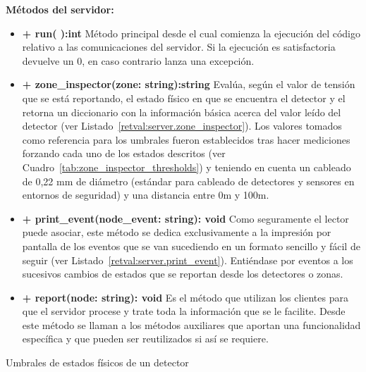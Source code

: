 

\textbf{Métodos del servidor:}

\begin{itemize}
  \item \textbf{+ run( ):int} Método principal desde el cual comienza la ejecución del código relativo a las comunicaciones del servidor. Si la ejecución es satisfactoria devuelve un 0, en caso contrario lanza una excepción.
  \item \textbf{+ zone\_inspector(zone: string):string} Evalúa, según el valor de tensión que se está reportando, el estado físico en que se encuentra el detector y el retorna un diccionario con la información básica acerca del valor leído del detector (ver Listado~\ref{retval:server.zone_inspector}). Los valores tomados como referencia para los umbrales fueron establecidos tras hacer mediciones forzando cada uno de los estados descritos (ver Cuadro~\ref{tab:zone_inspector_thresholds}) y teniendo en cuenta un cableado de 0,22 mm de diámetro (estándar para cableado de detectores y sensores en entornos de seguridad) y una distancia entre 0m y 100m. 

  \item \textbf{+ print\_event(node\_event: string): void} Como seguramente el lector puede asociar, este método se dedica exclusivamente a la impresión por pantalla de los eventos que se van sucediendo en un formato sencillo y fácil de seguir (ver Listado~\ref{retval:server.print_event}). Entiéndase por eventos a los sucesivos cambios de estados que se reportan desde los detectores o zonas.
  \item \textbf{+ report(node: string): void} Es el método que utilizan los clientes para que el servidor procese y trate toda la información que se le facilite. Desde este método se llaman a los métodos auxiliares que aportan una funcionalidad específica y que pueden ser reutilizados si así se requiere.
\end{itemize}



\begin{table}[hp]
  \centering
  \centering
  \caption{Umbrales de estados físicos de un detector}
  \label{tab:zone_inspector_thresholds}
  {\small
  
  }
\end{table}
\hfill



